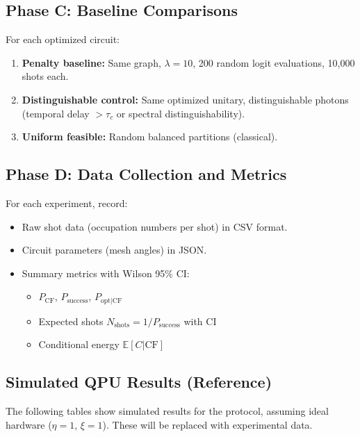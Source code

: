 \subsection{Phase C: Baseline Comparisons}

For each optimized circuit:
\begin{enumerate}
\item \textbf{Penalty baseline:} Same graph, $\lambda=10$, 200 random logit evaluations, 10,000 shots each.
\item \textbf{Distinguishable control:} Same optimized unitary, distinguishable photons (temporal delay $> \tau_c$ or spectral distinguishability).
\item \textbf{Uniform feasible:} Random balanced partitions (classical).
\end{enumerate}

\subsection{Phase D: Data Collection and Metrics}

For each experiment, record:
\begin{itemize}
\item Raw shot data (occupation numbers per shot) in CSV format.
\item Circuit parameters (mesh angles) in JSON.
\item Summary metrics with Wilson 95\% CI:
  \begin{itemize}
  \item $P_{\mathrm{CF}}$, $P_{\mathrm{success}}$, $P_{\mathrm{opt|CF}}$
  \item Expected shots $N_{\mathrm{shots}} = 1/P_{\mathrm{success}}$ with CI
  \item Conditional energy $\mathbb{E}[C|\mathrm{CF}]$
  \end{itemize}
\end{itemize}

\subsection{Simulated QPU Results (Reference)}

The following tables show simulated results for the protocol, assuming ideal hardware ($\eta=1$, $\xi=1$). These will be replaced with experimental data.

